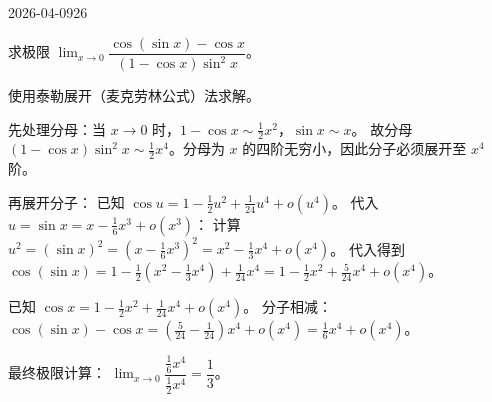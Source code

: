 \begin{mistake}{2026-04-09}{26}

\begin{problemcontent}
求极限 \( \lim_{x \to 0} \dfrac{\cos(\sin x) - \cos x}{(1 - \cos x)\sin^2 x} \)。
\end{problemcontent}

\begin{solutioncontent}
使用泰勒展开（麦克劳林公式）法求解。

先处理分母：当 \( x \to 0 \) 时，\( 1 - \cos x \sim \frac{1}{2}x^2 \)，\( \sin x \sim x \)。
故分母 \( (1 - \cos x)\sin^2 x \sim \frac{1}{2}x^4 \)。分母为 \( x \) 的四阶无穷小，因此分子必须展开至 \( x^4 \) 阶。

再展开分子：
已知 \( \cos u = 1 - \frac{1}{2}u^2 + \frac{1}{24}u^4 + o(u^4) \)。
代入 \( u = \sin x = x - \frac{1}{6}x^3 + o(x^3) \)：
计算 \( u^2 = (\sin x)^2 = (x - \frac{1}{6}x^3)^2 = x^2 - \frac{1}{3}x^4 + o(x^4) \)。
代入得到 \( \cos(\sin x) = 1 - \frac{1}{2}(x^2 - \frac{1}{3}x^4) + \frac{1}{24}x^4 = 1 - \frac{1}{2}x^2 + \frac{5}{24}x^4 + o(x^4) \)。

已知 \( \cos x = 1 - \frac{1}{2}x^2 + \frac{1}{24}x^4 + o(x^4) \)。
分子相减：
\( \cos(\sin x) - \cos x = \left( \frac{5}{24} - \frac{1}{24} \right)x^4 + o(x^4) = \frac{1}{6}x^4 + o(x^4) \)。

最终极限计算：
\( \lim_{x \to 0} \dfrac{\frac{1}{6}x^4}{\frac{1}{2}x^4} = \dfrac{1}{3} \)。
\end{solutioncontent}


\end{mistake}
